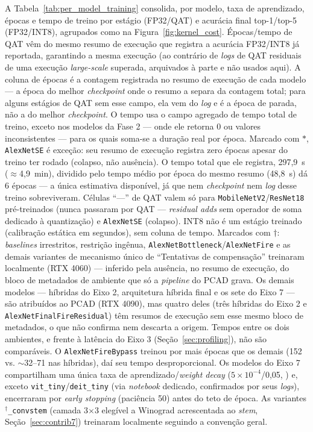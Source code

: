 \documentclass[conference]{IEEEtran}
\begin{document}
A Tabela~\ref{tab:per_model_training} consolida, por modelo, taxa de aprendizado, épocas e tempo de
treino por estágio (FP32/QAT) e acurácia final top-1/top-5 (FP32/INT8), agrupados como na
Figura~\ref{fig:kernel_cost}. Épocas/tempo de QAT vêm do mesmo resumo de execução que registra a
acurácia FP32/INT8 já reportada, garantindo a mesma execução (ao contrário de \textit{logs} de QAT
residuais de uma execução \textit{large-scale} superada, arquivados à parte e não usados aqui).
A coluna de épocas é a contagem registrada no resumo de execução de cada modelo — a época do melhor
\textit{checkpoint} onde o resumo a separa da contagem total; para alguns estágios de QAT sem esse
campo, ela vem do \textit{log} e é a época de parada, não a do melhor \textit{checkpoint}. O tempo
usa o campo agregado de tempo total de treino, exceto nos modelos da Fase 2 — onde ele retorna 0 ou
valores inconsistentes — para os quais soma-se a duração real por época. Marcado com $*$, \texttt{AlexNetSE} é exceção: seu resumo de
execução registra zero épocas apesar do treino ter rodado (colapso, não ausência). O tempo total
que ele registra, 297,9~s ($\approx$4,9~min), dividido pelo tempo médio por época do mesmo resumo
(48,8~s) dá 6 épocas — a única estimativa disponível, já que nem \textit{checkpoint} nem \textit{log}
desse treino sobreviveram. Células ``—'' de QAT valem só para
\texttt{MobileNetV2}/\texttt{ResNet18}
pré-treinados (nunca passaram por QAT — \textit{residual adds} sem operador de soma dedicado à
quantização) e
\texttt{AlexNetSE} (colapso). INT8 não é um estágio treinado (calibração estática em segundos), sem
coluna de tempo. Marcados com $\dagger$: \textit{baselines} irrestritos, restrição ingênua,
\texttt{AlexNetBottleneck}/\texttt{AlexNetFire} e as demais variantes de mecanismo único de
``Tentativas de compensação'' treinaram localmente (RTX 4060) — inferido pela ausência, no resumo
de execução, do bloco de metadados de ambiente que só a \textit{pipeline} do PCAD grava.
Os demais modelos — híbridas do Eixo 2, arquitetura híbrida final e os sete do Eixo 7 — são
atribuídos ao PCAD (RTX 4090), mas quatro deles (três híbridas do Eixo 2 e
\texttt{AlexNetFinalFireResidual}) têm resumos de execução sem esse mesmo bloco de metadados, o
que não confirma nem descarta a origem. Tempos entre os dois ambientes, e frente à latência do Eixo 3
(Seção~\ref{sec:profiling}), não são comparáveis. O \texttt{AlexNetFireBypass} treinou por mais
épocas que os demais (152 vs. $\sim$32--71 nas híbridas), daí seu tempo desproporcional. Os modelos do Eixo 7
compartilham uma única taxa de aprendizado/\textit{weight decay} ($5\times10^{-4}$/0,05,
\cite{touvron2021distillation}) e, exceto \texttt{vit\_tiny}/\texttt{deit\_tiny} (via
\textit{notebook} dedicado, confirmados por seus \textit{logs}), encerraram por \textit{early
stopping} (paciência 50) antes do teto de época. As variantes $^\dagger$\texttt{\_convstem}
(camada 3$\times$3 elegível a Winograd acrescentada ao \textit{stem}, Seção~\ref{sec:contrib7}) treinaram localmente
seguindo a convenção geral.
\end{document}
